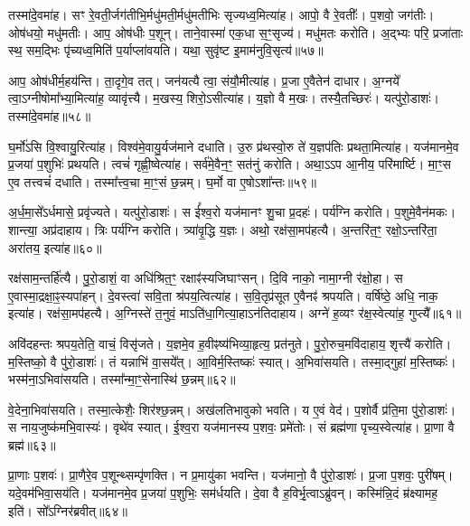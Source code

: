 तस्मा॑दे॒वमा॑ह।
सꣳ रे॒वती॒र्जग॑तीभि॒र्मधु॑मती॒र्मधु॑मतीभिः सृज्यध्व॒मित्या॑ह।
आपो॒ वै रे॒वतीः᳚।
प॒शवो॒ जग॑तीः।
ओष॑धयो॒ मधु॑मतीः।
आप॒ ओष॑धीः प॒शून्।
ताने॒वास्मा॑ एक॒धा स॒ꣳ॒सृज्य॑।
मधु॑मतः करोति।
अ॒द्भ्यः परि॒ प्रजा॑ताः स्थ॒ सम॒द्भिः पृ॑च्यध्व॒मिति॑ प॒र्याप्ला॑वयति।
यथा॒ सुवृ॑ष्ट इ॒माम॑नुवि॒सृत्य॑॥५७॥\ip

आप॒ ओष॑धीर्म॒हय॑न्ति।
ता॒दृगे॒व तत्।
जन॑यत्यै त्वा॒ संयौ॒मीत्या॑ह।
प्र॒जा ए॒वैतेन॑ दाधार।
अ॒ग्नये᳚ त्वा॒\-ऽग्नीषोमा᳚भ्या॒मित्या॑ह॒ व्यावृ॑त्त्यै।
म॒खस्य॒ शिरो॒\-ऽसीत्या॑ह।
य॒ज्ञो वै म॒खः।
तस्यै॒तच्छिरः॑।
यत्पु॑रो॒डाशः॑।
तस्मा॑दे॒वमा॑ह॥५८॥\ip

घ॒र्मो॑ऽसि वि॒श्वायु॒रित्या॑ह।
विश्व॑मे॒वायु॒र्यज॑माने दधाति।
उ॒रु प्र॑थस्वो॒रु ते॑ य॒ज्ञप॑तिः प्रथता॒मित्या॑ह।
यज॑मानमे॒व प्र॒जया॑ प॒शुभिः॑ प्रथयति।
त्वचं॑ गृह्णी॒ष्वेत्या॑ह।
सर्व॑मे॒वैन॒ꣳ॒ सत॑नुं करोति।
अथा॒ऽऽप आ॒नीय॒ परि॑मार्ष्टि।
मा॒ꣳ॒स ए॒व तत्त्वचं॑ दधाति।
तस्मा᳚त्त्व॒चा मा॒ꣳ॒सं छ॒न्नम्।
घ॒र्मो वा ए॒षो\-ऽशा᳚न्तः॥५९॥\ip

अ॒र्ध॒मा॒से᳚\-ऽर्धमासे॒ प्रवृ॑ज्यते।
यत्पु॑रो॒डाशः॑।
स ई᳚श्व॒रो यज॑मानꣳ शु॒चा प्र॒दहः॑।
पर्य॑ग्नि करोति।
प॒शुमे॒वैन॑मकः।
शान्त्या॒ अप्र॑दाहाय।
त्रिः पर्य॑ग्नि करोति।
त्र्या॑वृ॒द्धि य॒ज्ञः।
अथो॒ रक्ष॑सा॒मप॑हत्यै।
अ॒न्तरि॑त॒ꣳ॒ रक्षो॒\-ऽन्तरि॑ता॒ अरा॑तय॒ इत्या॑ह॥६०॥\ip

रक्ष॑साम॒न्तर्\mbox{}हि॑त्यै।
पु॒रो॒डाशं॒ वा अधि॑श्रित॒ꣳ॒ रक्षाꣴ॑स्य\-जिघाꣳसन्।
दि॒वि नाको॒ नामा॒ग्नी र॑क्षो॒हा।
स ए॒वास्मा॒द्रक्षा॒ꣴ॒\-स्यपा॑\-हन्।
दे॒वस्त्वा॑ सवि॒ता श्र॑पय॒त्वित्या॑ह।
स॒वि॒तृप्र॑सूत ए॒वैनꣴ॑ श्रपयति।
वर्\mbox{}षि॑ष्ठे॒ अधि॒ नाक॒ इत्या॑ह।
रक्ष॑सा॒मप॑हत्यै।
अ॒ग्निस्ते॑ त॒नुवं॒ माऽति॑धा॒गित्या॒हा\-ऽन॑तिदाहाय।
अग्ने॑ ह॒व्यꣳ र॑क्ष॒स्वेत्या॑ह॒ गुप्त्यै᳚॥६१॥\ip

अवि॑दहन्तः श्रपय॒तेति॒ वाचं॒ विसृ॑जते।
य॒ज्ञमे॒व ह॒वीꣴष्य॑भि\-व्या॒हृत्य॒ प्रत॑नुते।
पु॒रो॒रुच॒मवि॑दाहाय॒ शृत्त्यै॑ करोति।
म॒स्तिष्को॒ वै पु॑रो॒डाशः॑।
तं यन्नाभि॑ वा॒सये᳚त्।
आ॒विर्म॒स्तिष्कः॑ स्यात्।
अ॒भिवा॑सयति।
तस्मा॒द्गुहा॑ म॒स्तिष्कः॑।
भस्म॑ना॒\-ऽभिवा॑सयति।
तस्मा᳚न्मा॒ꣳ॒सेनास्थि॑ छ॒न्नम्॥६२॥\ip

वे॒देना॒भिवा॑सयति।
तस्मा॒त्केशैः॒ शिर॑श्छ॒न्नम्।
अख॑लति\-भावुको भवति।
य ए॒वं वेद॑।
प॒शोर्वै प्र॑ति॒मा पु॑रो॒डाशः॑।
स नाय॒जुष्क॑मभि॒वास्यः॑।
वृथे॑व स्यात्।
ई॒श्व॒रा यज॑मानस्य प॒शवः॒ प्रमे॑तोः।
सं ब्रह्म॑णा पृच्य॒स्वेत्या॑ह।
प्रा॒णा वै ब्रह्म॑॥६३॥\ip

प्रा॒णाः प॒शवः॑।
प्रा॒णैरे॒व प॒शून्थ्सम्पृ॑णक्ति।
न प्र॒मायु॑का भवन्ति।
यज॑मानो॒ वै पु॑रो॒डाशः॑।
प्र॒जा प॒शवः॒ पुरी॑षम्।
यदे॒वम॑भिवा॒सय॑ति।
यज॑मानमे॒व प्र॒जया॑ प॒शुभिः॒ सम॑र्धयति।
दे॒वा वै ह॒विर्भृ॒त्वा\-ऽब्रु॑वन्।
कस्मि॑न्नि॒दं म्र॑क्ष्यामह॒ इति॑।
सो᳚ऽग्निर॑ब्रवीत्॥६४॥\ip

